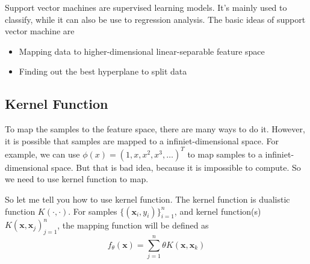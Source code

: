 \documentclass{article}
\begin{document}
Support vector machines are supervised learning models. It's mainly used to classify,
while it can also be use to regression analysis.
The basic ideas of support vector machine are
\begin{itemize}
\item Mapping data to higher-dimensional linear-separable feature space
\item Finding out the best hyperplane to split data
\end{itemize}

\subsection{Kernel Function}
\label{sec:svm:kf}

To map the samples to the feature space, there are many ways to do it.
However, it is possible that samples are mapped to a infiniet-dimensional space.
For example, we can use $\phi(x)=(1,x,x^2,x^3,\dots)^T$ to map samples to a infiniet-dimensional space.
But that is bad idea, because it is impossible to compute.
So we need to use kernel function to map.

So let me tell you how to use kernel function.
The kernel function is dualistic function $K(\cdot,\cdot)$.
For samples $\{(\mathbf{x}_i,y_i)\}^n_{i=1}$, and kernel function(s) $K(\mathbf{x},\mathbf{x}_j)^n_{j=1}$,
the mapping function will be defined as
\begin{equation}
  \label{eq:mapping}
  f_\theta(\mathbf{x})=\sum\limits_{j=1}^{n}\theta K(\mathbf{x},\mathbf{x}_k)
\end{equation}
\end{document}
